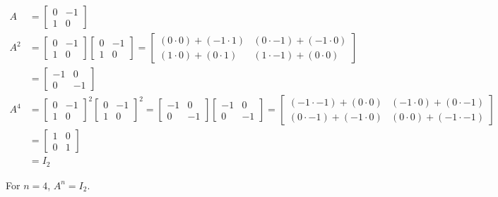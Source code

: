 \documentclass[letterpaper,12pt]{report}
\begin{document}
\begin{align*}
  A &= \begin{bmatrix}
    0 & -1 \\
    1 & 0
  \end{bmatrix} \\
  A^2 &= \begin{bmatrix}
    0 & -1 \\
    1 & 0
  \end{bmatrix} \begin{bmatrix}
    0 & -1 \\
    1 & 0
  \end{bmatrix} = \begin{bmatrix}
    (0 \cdot 0) + (-1 \cdot 1) & (0 \cdot -1) + (-1 \cdot 0) \\
    (1 \cdot 0) + (0 \cdot 1) & (1 \cdot -1) + (0 \cdot 0)
  \end{bmatrix} \\
  &= \begin{bmatrix}
    -1 & 0 \\
    0 & -1
  \end{bmatrix} \\
  A^4 &= \begin{bmatrix}
    0 & -1 \\
    1 & 0
  \end{bmatrix}^2 \begin{bmatrix}
    0 & -1 \\
    1 & 0
  \end{bmatrix}^2 = \begin{bmatrix}
    -1 & 0 \\
    0 & -1
  \end{bmatrix} \begin{bmatrix}
    -1 & 0 \\
    0 & -1
  \end{bmatrix} = \begin{bmatrix}
    (-1 \cdot -1) + (0 \cdot 0) & (-1 \cdot 0) + (0 \cdot -1) \\
    (0 \cdot -1) + (-1 \cdot 0) & (0 \cdot 0) + (-1 \cdot -1)
  \end{bmatrix} \\
  &= \begin{bmatrix}
    1 & 0 \\
    0 & 1
  \end{bmatrix} \\
  &= I_2
\end{align*}

For $n=4$, $A^n = I_2$.
\end{document}
